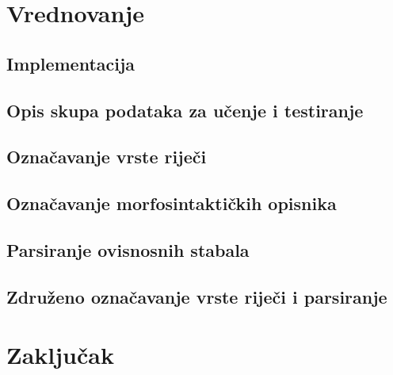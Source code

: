 \documentclass[times, utf8, diplomski]{fer}
\begin{document}
\chapter{Vrednovanje}

\section{Implementacija}


\section{Opis skupa podataka za učenje i testiranje}


\section{Označavanje vrste riječi}


\section{Označavanje morfosintaktičkih opisnika}


\section{Parsiranje ovisnosnih stabala}


\section{Združeno označavanje vrste riječi i parsiranje}


\chapter{Zaključak}










\nocite{daume06thesis}
\nocite{daume09searn}
\nocite{daume06searn-practice}
\nocite{daume15reductions}
\nocite{daume15lols}
\nocite{daume15rewrite}
\nocite{daume14lts}
\end{document}
